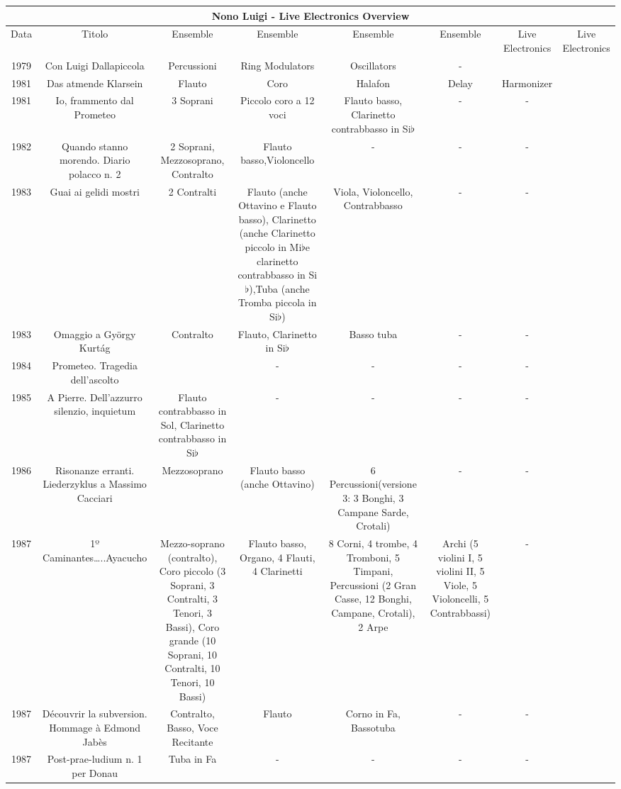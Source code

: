 \documentclass{article}
\begin{document}
\begin{tabular}{ |c|c|c|c|c|c|c|c|}
\hline
\multicolumn{8}{|c|}{Nono Luigi - Live Electronics Overview} \\
\hline
Data& Titolo& Ensemble& Ensemble& Ensemble&Ensemble& Live Electronics &Live Electronics\\
\hline
1979 & Con Luigi Dallapiccola& Percussioni  & Ring Modulators &Oscillators &-& & \\
1981 & Das atmende Klarsein &Flauto & Coro & Halafon &Delay &Harmonizer& \\
1981 & Io, frammento dal Prometeo&3 Soprani&Piccolo coro a 12 voci&Flauto basso, Clarinetto contrabbasso in Si$\flat$&-&-&\\
1982 & Quando stanno morendo. Diario polacco n. 2&2 Soprani, Mezzosoprano, Contralto&Flauto basso,Violoncello&-&-&-& \\
1983 &Guai ai gelidi mostri &2 Contralti&Flauto (anche Ottavino e Flauto basso), Clarinetto (anche Clarinetto piccolo in Mi$\flat$e clarinetto contrabbasso in Si$\flat$),Tuba (anche Tromba piccola in Si$\flat$)&Viola, Violoncello, Contrabbasso&-&-& \\
1983 &Omaggio a György Kurtág &Contralto&Flauto, Clarinetto in Si$\flat$&Basso tuba&-&-& \\
1984 &Prometeo. Tragedia dell’ascolto &&-&-&-&-& \\
1985 &A Pierre. Dell’azzurro silenzio, inquietum &Flauto contrabbasso in Sol, Clarinetto contrabbasso in Si$\flat$&-&-&-&-& \\
1986 &Risonanze erranti. Liederzyklus a Massimo Cacciari &Mezzosoprano&Flauto basso (anche Ottavino)&6 Percussioni\newline (versione 3: 3 Bonghi, 3 Campane Sarde, Crotali)&-&-&\\
1987 &1º Caminantes…..Ayacucho&Mezzo-soprano (contralto), Coro piccolo (3 Soprani, 3 Contralti, 3 Tenori, 3 Bassi), Coro grande (10 Soprani, 10 Contralti, 10 Tenori, 10 Bassi)& Flauto basso, Organo, 4 Flauti, 4 Clarinetti&8 Corni, 4 trombe, 4 Tromboni, 5 Timpani, Percussioni (2 Gran Casse, 12 Bonghi, Campane, Crotali), 2 Arpe&Archi (5 violini I, 5 violini II, 5 Viole, 5 Violoncelli, 5 Contrabbassi)&-& \\
1987 &Découvrir la subversion. Hommage à Edmond Jabès & Contralto, Basso, Voce Recitante &Flauto&Corno in Fa, Bassotuba&-&-& \\
1987 &Post-prae-ludium n. 1 per Donau &Tuba in Fa&-&-&-&-& \\
\hline
\end{tabular}
\end{document}
